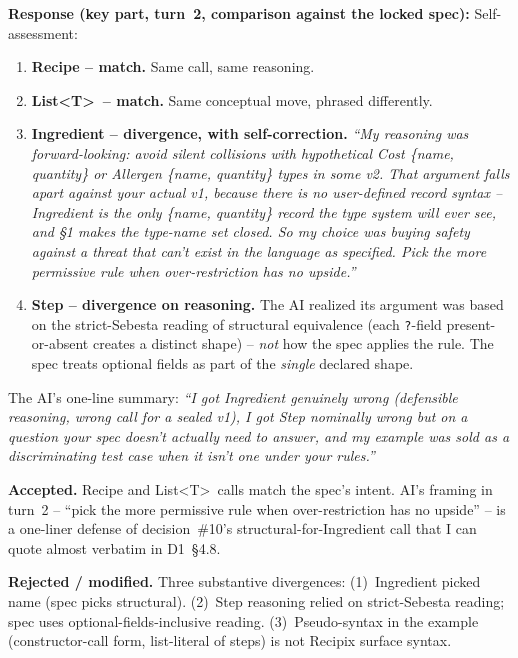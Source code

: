 \documentclass[11pt,a4paper]{article}
\newcommand{\field}[1]{\noindent\textbf{#1}}
\begin{document}
\field{Response (key part, turn~2, comparison against the locked spec):}
Self-assessment:

\begin{enumerate}[leftmargin=*,itemsep=2pt]
  \item \textbf{Recipe -- match.} Same call, same reasoning.
  \item \textbf{List\textless T\textgreater\ -- match.} Same conceptual
        move, phrased differently.
  \item \textbf{Ingredient -- divergence, with self-correction.}
        \emph{``My reasoning was forward-looking: avoid silent
        collisions with hypothetical Cost \{name, quantity\} or
        Allergen \{name, quantity\} types in some v2. That argument
        falls apart against your actual v1, because there is no
        user-defined record syntax -- Ingredient is the only \{name,
        quantity\} record the type system will ever see, and \S1 makes
        the type-name set closed. So my choice was buying safety
        against a threat that can't exist in the language as specified.
        Pick the more permissive rule when over-restriction has no
        upside.''}
  \item \textbf{Step -- divergence on reasoning.} The AI realized its
        argument was based on the strict-Sebesta reading of structural
        equivalence (each \texttt{?}-field present-or-absent creates a
        distinct shape) -- \emph{not} how the spec applies the rule.
        The spec treats optional fields as part of the \emph{single}
        declared shape.
\end{enumerate}

The AI's one-line summary: \emph{``I got Ingredient genuinely wrong
(defensible reasoning, wrong call for a sealed v1), I got Step
nominally wrong but on a question your spec doesn't actually need to
answer, and my example was sold as a discriminating test case when it
isn't one under your rules.''}

\field{Accepted.} Recipe and List\textless T\textgreater\ calls match
the spec's intent. AI's framing in turn~2 -- ``pick the more permissive
rule when over-restriction has no upside'' -- is a one-liner defense of
decision~\#10's structural-for-Ingredient call that I can quote almost
verbatim in D1~\S4.8.

\field{Rejected / modified.} Three substantive divergences:
(1)~Ingredient picked name (spec picks structural).
(2)~Step reasoning relied on strict-Sebesta reading; spec uses
optional-fields-inclusive reading. (3)~Pseudo-syntax in the example
(constructor-call form, list-literal of steps) is not Recipix surface
syntax.
\end{document}
